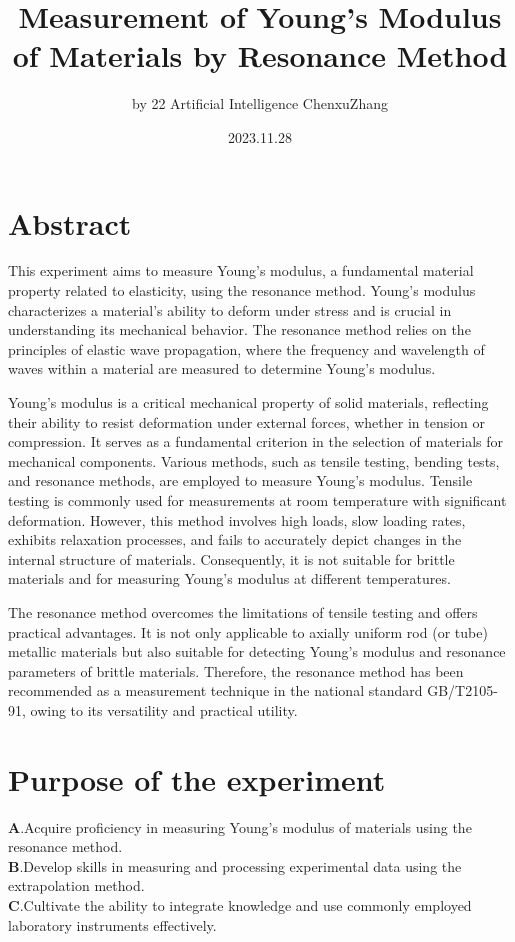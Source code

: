 \documentclass[UTF8]{article}
\title{Measurement of Young's Modulus of Materials by Resonance Method}
\author{by 22 Artificial Intelligence ChenxuZhang}
\date{2023.11.28}
\begin{document}
	
	\fancyfoot[C]{\thepage}
	
	\maketitle
	\tableofcontents
	\newpage
	
	\section{Abstract}
	
This experiment aims to measure Young's modulus, a fundamental material property related to elasticity, using the resonance method. Young's modulus characterizes a material's ability to deform under stress and is crucial in understanding its mechanical behavior. The resonance method relies on the principles of elastic wave propagation, where the frequency and wavelength of waves within a material are measured to determine Young's modulus.

Young's modulus is a critical mechanical property of solid materials, reflecting their ability to resist deformation under external forces, whether in tension or compression. It serves as a fundamental criterion in the selection of materials for mechanical components. Various methods, such as tensile testing, bending tests, and resonance methods, are employed to measure Young's modulus. Tensile testing is commonly used for measurements at room temperature with significant deformation. However, this method involves high loads, slow loading rates, exhibits relaxation processes, and fails to accurately depict changes in the internal structure of materials. Consequently, it is not suitable for brittle materials and for measuring Young's modulus at different temperatures.

The resonance method overcomes the limitations of tensile testing and offers practical advantages. It is not only applicable to axially uniform rod (or tube) metallic materials but also suitable for detecting Young's modulus and resonance parameters of brittle materials. Therefore, the resonance method has been recommended as a measurement technique in the national standard GB/T2105-91, owing to its versatility and practical utility.

 
	
\section{Purpose of the experiment}
   $\bm{A}$.Acquire proficiency in measuring Young's modulus of materials using the resonance method.\\
   $\bm{B}$.Develop skills in measuring and processing experimental data using the extrapolation method.\\
   $\bm{C}$.Cultivate the ability to integrate knowledge and use commonly employed laboratory instruments effectively.
   
\end{document}
